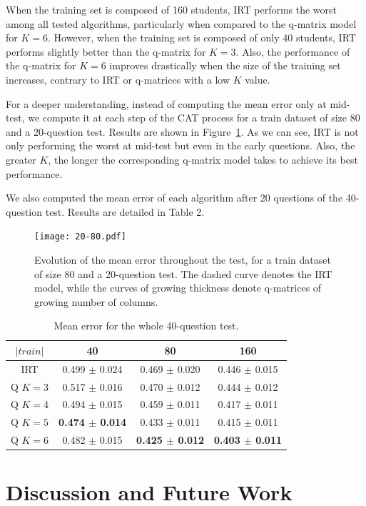 \documentclass{sig-alternate}
\begin{document}
When the training set is composed of 160 students, IRT performs the worst among all tested algorithms, particularly when compared to the q-matrix model for $K = 6$. However, when the training set is composed of only 40 students, IRT performs slightly better than the q-matrix for $K = 3$. Also, the performance of the q-matrix for $K = 6$ improves drastically when the size of the training set increases, contrary to IRT or q-matrices with a low $K$ value.

For a deeper understanding, instead of computing the mean error only at mid-test, we compute it at each step of the CAT process for a train dataset of size 80 and a 20-question test. Results are shown in Figure~\ref{fig:1}. As we can see, IRT is not only performing the worst at mid-test but even in the early questions. Also, the greater $K$, the longer the corresponding q-matrix model takes to achieve its best performance.

We also computed the mean error of each algorithm after 20 questions of the 40-question test. Results are detailed in Table 2.

\begin{figure}
\texttt{[image: 20-80.pdf]}
\caption{Evolution of the mean error throughout the test, for a train dataset of size 80 and a 20-question test. The dashed curve denotes the IRT model, while the curves of growing thickness denote q-matrices of growing number of columns.}
\label{fig:1}
\end{figure}

\begin{table}[H]
\small\centering\begin{tabular}{@{}cccc@{}}
$|train|$ & 40 & 80 & 160\\
\hline
IRT & 0.499 $\pm$ 0.024 & 0.469 $\pm$ 0.020 & 0.446 $\pm$ 0.015\\
Q $K = 3$ & 0.517 $\pm$ 0.016 & 0.470 $\pm$ 0.012 & 0.444 $\pm$ 0.012\\
Q $K = 4$ & 0.494 $\pm$ 0.015 & 0.459 $\pm$ 0.011 & 0.417 $\pm$ 0.011\\
Q $K = 5$ & \textbf{0.474 $\pm$ 0.014} & 0.433 $\pm$ 0.011 & 0.415 $\pm$ 0.011\\
Q $K = 6$ & 0.482 $\pm$ 0.015 & \textbf{0.425 $\pm$ 0.012} & \textbf{0.403 $\pm$ 0.011}\\
\end{tabular}
\caption{Mean error for the whole 40-question test.}
\label{tab:40q}
\end{table}

\section{Discussion and Future Work}
\end{document}
